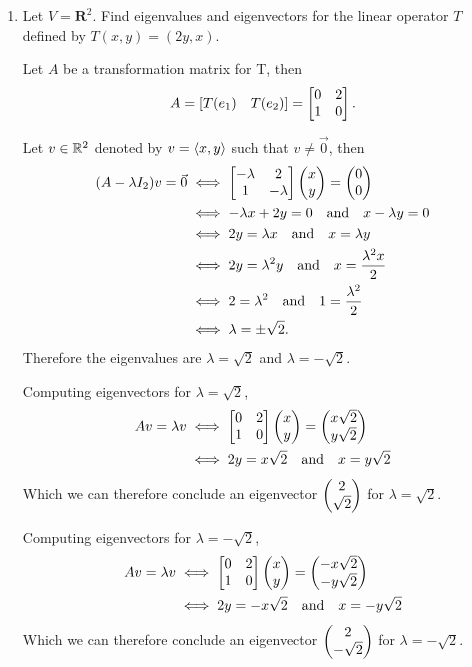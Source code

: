 \begin{enumerate}
    \item Let $V = \mathbf{R}^2$. Find eigenvalues and eigenvectors for the linear operator $T$ defined by $T(x,y) = (2y , x)$.
    \begin{mybox}
        Let $A$ be a transformation matrix for T, then
        $$A = \left[ {T(e_1) \quad T(e_2)} \right] = \begin{bmatrix}{0} & {2}\\{1}&{0}\end{bmatrix}.$$

        \nl Let $v \in \mathbb{R}^2$ denoted by $v = \left\langle{x,y}\right\rangle$ such that $v \neq \vec{0}$, then
        \begin{align*}
                (A-\lambda I_2)v = \vec{0} &\iff \begin{bmatrix}{-\lambda} & {2}\\{1}&{-\lambda}\end{bmatrix} \begin{pmatrix}{x}\\{y}\end{pmatrix} = \begin{pmatrix}{0}\\{0}\end{pmatrix}\\
                &\iff -\lambda x + 2y = 0 \quad \text{and} \quad x - \lambda y = 0\\
                & \iff 2y = \lambda x  \quad \text{and} \quad x = \lambda y\\
                & \iff 2y = \lambda^2 y  \quad \text{and} \quad x = \frac{\lambda^2x}{2}\\
                & \iff 2 = \lambda^2  \quad \text{and} \quad 1 = \frac{\lambda^2}{2}\\
                & \iff \lambda = \pm \sqrt{2}.
        \end{align*}
        Therefore the eigenvalues are $\lambda = \sqrt{2}$ and $\lambda = -\sqrt{2}$. 

        \nnl Computing eigenvectors for $\lambda = \sqrt{2}$, 
        \begin{align*}
            Av = \lambda v & \iff \begin{bmatrix}{0} & {2}\\{1}&{0}\end{bmatrix} \begin{pmatrix}{x}\\{y}\end{pmatrix} = \begin{pmatrix}{x\sqrt{2}}\\{y\sqrt{2}}\end{pmatrix}\\
            &\iff 2y = x\sqrt{2} \quad \text{and} \quad x = y\sqrt{2}
        \end{align*}
        Which we can therefore conclude an eigenvector $\begin{pmatrix}{2}\\{\sqrt{2}}\end{pmatrix}$ for $\lambda = \sqrt{2}$.

        \nl Computing eigenvectors for $\lambda = -\sqrt{2}$, 
        \begin{align*}
            Av = \lambda v & \iff \begin{bmatrix}{0} & {2}\\{1}&{0}\end{bmatrix} \begin{pmatrix}{x}\\{y}\end{pmatrix} = \begin{pmatrix}{-x\sqrt{2}}\\{-y\sqrt{2}}\end{pmatrix}\\
            &\iff 2y = -x\sqrt{2} \quad \text{and} \quad x = -y\sqrt{2}
        \end{align*}
        Which we can therefore conclude an eigenvector $\begin{pmatrix}{2}\\{-\sqrt{2}}\end{pmatrix}$ for $\lambda = -\sqrt{2}$.
    \end{mybox}











\end{enumerate}
